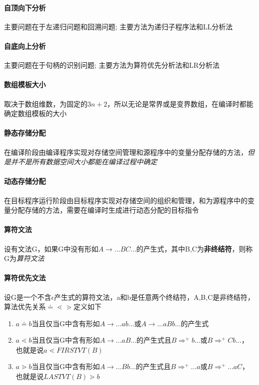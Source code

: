 \documentclass[UTF8]{ctexart} %
\begin{document}
\paragraph{自顶向下分析} 主要问题在于左递归问题和回溯问题; 主要方法为递归子程序法和LL分析法

\paragraph{自底向上分析} 主要问题在于句柄的识别问题; 主要方法为算符优先分析法和LR分析法

\paragraph{数组模板大小} 取决于数组维数，为固定的$3n+2$，所以无论是常界或是变界数组，在编译时都能确定数组模板的大小

\paragraph{静态存储分配} 在编译阶段由编译程序实现对存储空间管理和源程序中的变量分配存储的方法，\emph{但是并不是所有数据空间大小都能在编译过程中确定}

\paragraph{动态存储分配} 在目标程序运行阶段由目标程序实现对存储空间的组织和管理，和为源程序中的变量分配存储的方法，需要在编译时生成进行动态分配的目标指令

\paragraph{算符文法} 设有文法G，如果G中没有形如$A\rightarrow ...BC...$的产生式，其中B,C为\textbf{非终结符}，则称G为\emph{算符文法}

\paragraph{算符优先文法} 设G是一个不含$\epsilon$产生式的算符文法，a和b是任意两个终结符，A,B,C是非终结符，算法优先关系$\doteq \lessdot \gtrdot $定义如下

\begin{enumerate}
    \item $a\doteq b$当且仅当G中含有形如$A\rightarrow ...ab...$或$A\rightarrow ...aBb...$的产生式
    \item $a\lessdot b$当且仅当G中含有形如$A\rightarrow ...aB...$的产生式且$B\Rightarrow^+ b...$或$B\Rightarrow^+ Cb...$，也就是说$a\lessdot FIRSTVT(B)$
    \item $a\gtrdot b$当且仅当G中含有形如$A\rightarrow ...Bb...$的产生式且$B\Rightarrow^+ ...a$或$B\Rightarrow^+ ...aC$，也就是说$LASTVT(B)\gtrdot b$
\end{enumerate}
\end{document}
